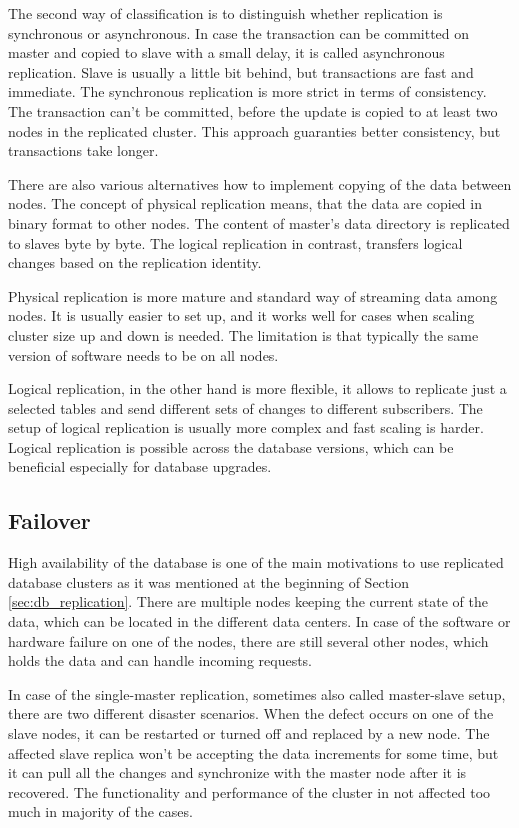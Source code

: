 \documentclass[
  digital, %
  twoside, %
  table,   %
  lof,     %
  lot,     %
]{fithesis3}
\begin{document}
The second way of classification is to distinguish whether replication is synchronous or asynchronous. In case the transaction can be committed on master and copied to slave with a small delay, it is called asynchronous replication. Slave is usually a little bit behind, but transactions are fast and immediate. The synchronous replication is more strict in terms of consistency. The transaction can't be committed, before the update is copied to at least two nodes in the replicated cluster. This approach guaranties better consistency, but transactions take longer.

There are also various alternatives how to implement copying of the data between nodes. The concept of physical replication means, that the data are copied in binary format to other nodes. The content of master's data directory is replicated to slaves byte by byte. The logical replication in contrast, transfers logical changes based on the replication identity.

Physical replication is more mature and standard way of streaming data among nodes. It is usually easier to set up, and it works well for cases when scaling cluster size up and down is needed. The limitation is that typically the same version of software needs to be on all nodes.

Logical replication, in the other hand is more flexible, it allows to replicate just a selected tables and send different sets of changes to different subscribers. The setup of logical replication is usually more complex and fast scaling is harder. Logical replication is possible across the database versions, which can be beneficial especially for database upgrades.

\subsection{Failover} \label{sec:failover}
High availability of the database is one of the main motivations to use replicated database clusters as it was mentioned at the beginning of Section \ref{sec:db_replication}. There are multiple nodes keeping the current state of the data, which can be located in the different data centers. In case of the software or hardware failure on one of the nodes, there are still several other nodes, which holds the data and can handle incoming requests.

In case of the single-master replication, sometimes also called master-slave setup, there are two different disaster scenarios. When the defect occurs on one of the slave nodes, it can be restarted or turned off and replaced by a new node. The affected slave replica won't be accepting the data increments for some time, but it can pull all the changes and synchronize with the master node after it is recovered. The functionality and performance of the cluster in not affected too much in majority of the cases.
\end{document}
